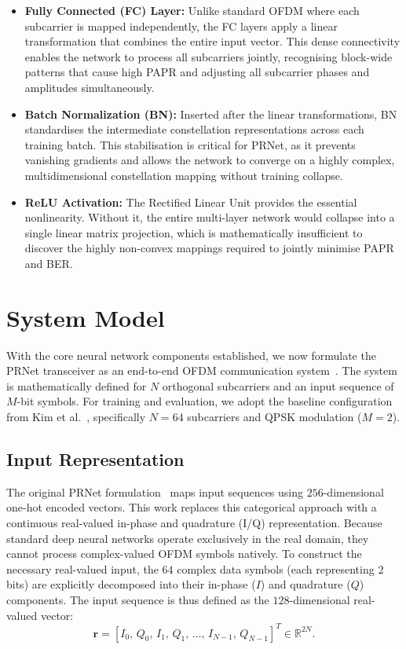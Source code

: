 \begin{itemize}
    \item \textbf{Fully Connected (FC) Layer:} Unlike standard OFDM where each subcarrier is mapped independently, the FC layers apply a linear transformation that combines the entire input vector. This dense connectivity enables the network to process all subcarriers jointly, recognising block-wide patterns that cause high PAPR and adjusting all subcarrier phases and amplitudes simultaneously.
    \item \textbf{Batch Normalization (BN):} Inserted after the linear transformations, BN standardises the intermediate constellation representations across each training batch. This stabilisation is critical for PRNet, as it prevents vanishing gradients and allows the network to converge on a highly complex, multidimensional constellation mapping without training collapse.
    \item \textbf{ReLU Activation:} The Rectified Linear Unit provides the essential nonlinearity. Without it, the entire multi-layer network would collapse into a single linear matrix projection, which is mathematically insufficient to discover the highly non-convex mappings required to jointly minimise PAPR and BER.
\end{itemize}

\section{System Model}
\label{sec:system_model}

With the core neural network components established, we now formulate the PRNet transceiver as an end-to-end OFDM communication system~\cite{kim2017novel}. The system is mathematically defined for $N$ orthogonal subcarriers and an input sequence of $M$-bit symbols. For training and evaluation, we adopt the baseline configuration from Kim et al.~\cite{kim2017novel}, specifically $N = 64$ subcarriers and QPSK modulation ($M = 2$).

\subsection{Input Representation}

The original PRNet formulation~\cite{kim2017novel} maps input sequences using $256$-dimensional one-hot encoded vectors. This work replaces this categorical approach with a continuous real-valued in-phase and quadrature (I/Q) representation. Because standard deep neural networks operate exclusively in the real domain, they cannot process complex-valued OFDM symbols natively. To construct the necessary real-valued input, the $64$ complex data symbols (each representing $2$ bits) are explicitly decomposed into their in-phase ($I$) and quadrature ($Q$) components. The input sequence is thus defined as the $128$-dimensional real-valued vector:
\begin{equation*}
    \bm{r} = [I_0,\, Q_0,\, I_1,\, Q_1,\, \dots,\, I_{N-1},\, Q_{N-1}]^T \in \mathbb{R}^{2N}.
\end{equation*}

